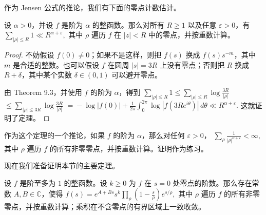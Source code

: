 作为 Jensen 公式的推论，我们有下面的零点计数估计。

\begin{theorem}[原文 Theorem 9.4]
	设 $\alpha>0$，并设 $f$ 是阶为 $\alpha$ 的整函数。那么对所有 $R\geq1$ 以及任意 $\varepsilon>0$，有
	\(\textstyle \sum_{|\rho|\leq\allowbreak{} R}1 \ll\allowbreak{} R^{\alpha+\allowbreak{}\varepsilon},\allowbreak{}\)
	其中 $\rho$ 遍历 $f$ 在 $|z|<R$ 中的零点，并按重数计算。
\end{theorem}

\begin{proof}
	不妨假设 $f(0)\neq0$；如果不是这样，则把 $f(s)$ 换成 $f(s)s^{-m}$，其中 $m$ 是合适的整数。也可以假设 $f$ 在圆周 $|s|=3R$ 上没有零点；否则把 $R$ 换成 $R+\delta$，其中某个实数 $\delta\in(0,1)$ 可以避开零点。

	由 Theorem 9.3，并使用 $f$ 的阶为 $\alpha$，得到
	\(\textstyle \sum_{|\rho|\leq\allowbreak{} R}1 \leq\allowbreak{} \sum_{|\rho|\leq\allowbreak{} R}\log\frac{3R}{|\rho|}\) \(\textstyle \leq\allowbreak{} \sum_{|\rho|\leq\allowbreak{} 3R}\log\frac{3R}{|\rho|}\) \(\textstyle =\allowbreak{} -\log|f(0)| +\allowbreak{} \frac{1}{2\pi} \int_0^{2\pi} \log|f(3Re^{i\theta})|\,d\theta \ll\allowbreak{} R^{\alpha+\allowbreak{}\varepsilon}.\)
	这就证明了定理。
\end{proof}

\begin{remark}
	作为这个定理的一个推论，如果 $f$ 的阶为 $\alpha$，那么对任何 $\varepsilon>0$，
	\(\textstyle \sum_\rho \frac{1}{|\rho|^{\alpha+\allowbreak{}\varepsilon}}<\infty,\allowbreak{}\)
	其中 $\rho$ 遍历 $f$ 的所有非零零点，并按重数计算。证明作为练习。
\end{remark}

现在我们准备证明本节的主要定理。

\begin{theorem}
	设 $f$ 是阶至多为 $1$ 的整函数。设 $k\geq0$ 为 $f$ 在 $s=0$ 处零点的阶数。那么存在常数 $A,B\in\mathbb C$，使得
	\(\textstyle f(s) =\allowbreak{} e^{A+\allowbreak{}Bs}s^k \prod_\rho \left(1-\frac{s}{\rho}\right)e^{s/\rho},\allowbreak{}\)
	其中 $\rho$ 遍历 $f$ 的所有非零零点，并按重数计算；乘积在不含零点的有界区域上一致收敛。
\end{theorem}

